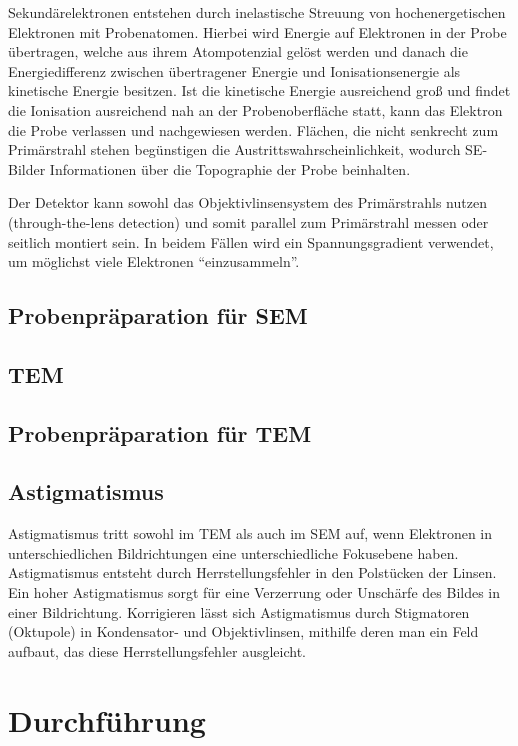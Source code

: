 Sekundärelektronen entstehen durch inelastische Streuung von hochenergetischen Elektronen mit Probenatomen.
Hierbei wird Energie auf Elektronen in der Probe übertragen, welche aus ihrem Atompotenzial gelöst werden und danach die Energiedifferenz zwischen übertragener Energie und Ionisationsenergie als kinetische Energie besitzen.
Ist die kinetische Energie ausreichend groß und findet die Ionisation ausreichend nah an der Probenoberfläche statt, kann das Elektron die Probe verlassen und nachgewiesen werden. %
Flächen, die nicht senkrecht zum Primärstrahl stehen begünstigen die Austrittswahrscheinlichkeit, wodurch SE-Bilder Informationen über die Topographie der Probe beinhalten.

Der Detektor kann sowohl das Objektivlinsensystem des Primärstrahls nutzen (through-the-lens detection) und somit parallel zum Primärstrahl messen oder seitlich montiert sein.
In beidem Fällen wird ein Spannungsgradient verwendet, um möglichst viele Elektronen \enquote{einzusammeln}.

\subsection{Probenpräparation für SEM}


\subsection{TEM}

\subsection{Probenpräparation für TEM}


\subsection{Astigmatismus} %

Astigmatismus tritt sowohl im TEM als auch im SEM auf, wenn Elektronen in unterschiedlichen Bildrichtungen eine unterschiedliche Fokusebene haben.
Astigmatismus entsteht durch Herrstellungsfehler in den Polstücken der Linsen.
Ein hoher Astigmatismus sorgt für eine Verzerrung oder Unschärfe des Bildes in einer Bildrichtung. \cite{MyScope}
Korrigieren lässt sich Astigmatismus durch Stigmatoren (Oktupole) in Kondensator- und Objektivlinsen, mithilfe deren man ein Feld aufbaut, das diese Herrstellungsfehler ausgleicht.

\section{Durchführung}


